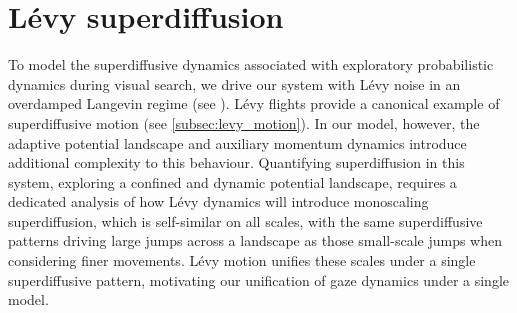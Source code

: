 \section{Lévy superdiffusion}\label{sec:levy_superdiffusion}
To model the superdiffusive dynamics associated with exploratory probabilistic dynamics during visual search, we drive our system with Lévy noise in an overdamped Langevin regime (see ). Lévy flights provide a canonical example of superdiffusive motion (see \cref{subsec:levy_motion}). In our model, however, the adaptive potential landscape and auxiliary momentum dynamics introduce additional complexity to this behaviour. Quantifying superdiffusion in this system, exploring a confined and dynamic potential landscape, requires a dedicated analysis of how Lévy dynamics will introduce monoscaling superdiffusion, which is self-similar on all scales, with the same superdiffusive patterns driving large jumps across a landscape as those small-scale jumps when considering finer movements. Lévy motion unifies these scales under a single superdiffusive pattern, motivating our unification of gaze dynamics under a single model.

